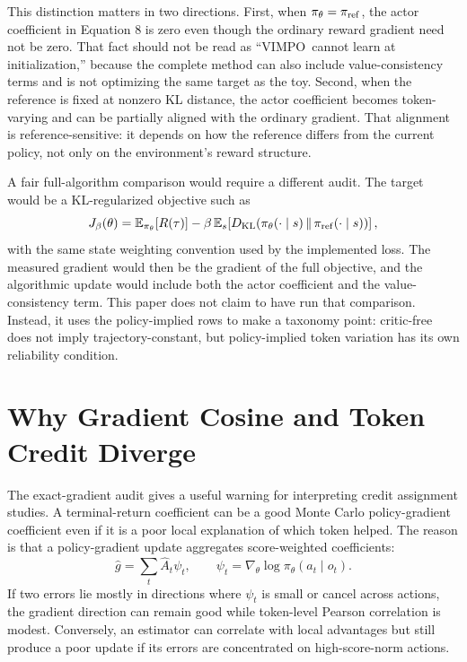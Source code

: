 \documentclass[11pt]{article}
\newcommand{\vimpo}{\textsc{VIMPO}}
\newcommand{\E}{\mathbb{E}}
\newcommand{\KL}{D_{\mathrm{KL}}}
\begin{document}
This distinction matters in two directions. First, when
$\pi_\theta=\pi_{\rm ref}$, the actor coefficient in Equation 8 is zero even
though the ordinary reward gradient need not be zero. That fact should not be
read as ``\vimpo\ cannot learn at initialization,'' because the complete method
can also include value-consistency terms and is not optimizing the same target
as the toy. Second, when the reference is fixed at nonzero KL distance, the
actor coefficient becomes token-varying and can be partially aligned with the
ordinary gradient. That alignment is reference-sensitive: it depends on how the
reference differs from the current policy, not only on the environment's
reward structure.

A fair full-algorithm comparison would require a different audit. The target
would be a KL-regularized objective such as
\begin{equation}
J_{\beta}(\theta)
=
\E_{\pi_\theta}[R(\tau)]
-
\beta\,
\E_{s}\!\left[
\KL(\pi_\theta(\cdot\mid s)\,\|\,\pi_{\rm ref}(\cdot\mid s))
\right],
\end{equation}
with the same state weighting convention used by the implemented loss. The
measured gradient would then be the gradient of the full objective, and the
algorithmic update would include both the actor coefficient and the
value-consistency term. This paper does not claim to have run that comparison.
Instead, it uses the policy-implied rows to make a taxonomy point: critic-free
does not imply trajectory-constant, but policy-implied token variation has its
own reliability condition.

\section{Why Gradient Cosine and Token Credit Diverge}

The exact-gradient audit gives a useful warning for interpreting credit
assignment studies. A terminal-return coefficient can be a good Monte Carlo
policy-gradient coefficient even if it is a poor local explanation of which
token helped. The reason is that a policy-gradient update aggregates
score-weighted coefficients:
\begin{equation}
\widehat g
=
\sum_t \widehat A_t \psi_t,
\qquad
\psi_t=\nabla_\theta\log\pi_\theta(a_t\mid o_t).
\end{equation}
If two errors lie mostly in directions where $\psi_t$ is small or cancel across
actions, the gradient direction can remain good while token-level Pearson
correlation is modest. Conversely, an estimator can correlate with local
advantages but still produce a poor update if its errors are concentrated on
high-score-norm actions.
\end{document}
